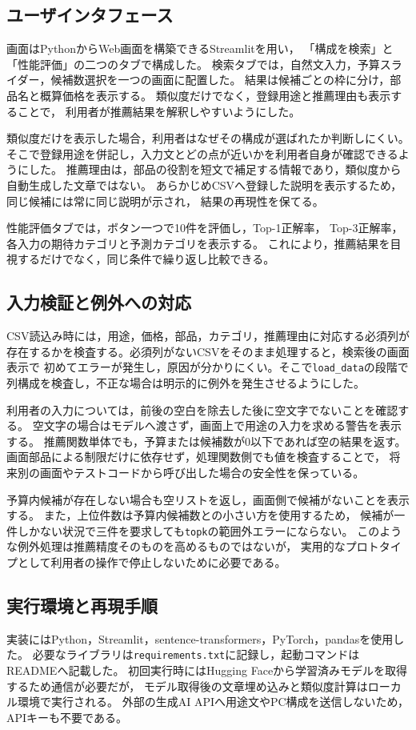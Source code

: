 \documentclass[a4paper,11pt]{article}
\begin{document}
\subsection{ユーザインタフェース}
画面はPythonからWeb画面を構築できるStreamlit\cite{Streamlit}を用い，
「構成を検索」と「性能評価」の二つのタブで構成した。
検索タブでは，自然文入力，予算スライダー，候補数選択を一つの画面に配置した。
結果は候補ごとの枠に分け，部品名と概算価格を表示する。
類似度だけでなく，登録用途と推薦理由も表示することで，
利用者が推薦結果を解釈しやすいようにした。

類似度だけを表示した場合，利用者はなぜその構成が選ばれたか判断しにくい。
そこで登録用途を併記し，入力文とどの点が近いかを利用者自身が確認できるようにした。
推薦理由は，部品の役割を短文で補足する情報であり，類似度から自動生成した文章ではない。
あらかじめCSVへ登録した説明を表示するため，同じ候補には常に同じ説明が示され，
結果の再現性を保てる。

性能評価タブでは，ボタン一つで10件を評価し，Top-1正解率，
Top-3正解率，各入力の期待カテゴリと予測カテゴリを表示する。
これにより，推薦結果を目視するだけでなく，同じ条件で繰り返し比較できる。

\subsection{入力検証と例外への対応}
CSV読込み時には，用途，価格，部品，カテゴリ，推薦理由に対応する必須列が
存在するかを検査する。必須列がないCSVをそのまま処理すると，検索後の画面表示で
初めてエラーが発生し，原因が分かりにくい。そこで\verb|load_data|の段階で
列構成を検査し，不正な場合は明示的に例外を発生させるようにした。

利用者の入力については，前後の空白を除去した後に空文字でないことを確認する。
空文字の場合はモデルへ渡さず，画面上で用途の入力を求める警告を表示する。
推薦関数単体でも，予算または候補数が0以下であれば空の結果を返す。
画面部品による制限だけに依存せず，処理関数側でも値を検査することで，
将来別の画面やテストコードから呼び出した場合の安全性を保っている。

予算内候補が存在しない場合も空リストを返し，画面側で候補がないことを表示する。
また，上位件数は予算内候補数との小さい方を使用するため，
候補が一件しかない状況で三件を要求しても\verb|topk|の範囲外エラーにならない。
このような例外処理は推薦精度そのものを高めるものではないが，
実用的なプロトタイプとして利用者の操作で停止しないために必要である。

\subsection{実行環境と再現手順}
実装にはPython，Streamlit，sentence-transformers，PyTorch，pandasを使用した。
必要なライブラリは\verb|requirements.txt|に記録し，起動コマンドはREADMEへ記載した。
初回実行時にはHugging Faceから学習済みモデルを取得するため通信が必要だが，
モデル取得後の文章埋め込みと類似度計算はローカル環境で実行される。
外部の生成AI APIへ用途文やPC構成を送信しないため，APIキーも不要である。
\end{document}
